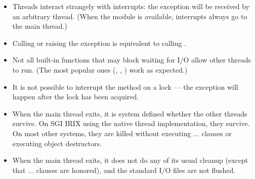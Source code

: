 
\begin{itemize}
\item
Threads interact strangely with interrupts: the
 exception will be received by an
arbitrary thread.  (When the 
module is available, interrupts always go to the main thread.)

\item
Calling  or raising the 
exception is equivalent to calling .

\item
Not all built-in functions that may block waiting for I/O allow other
threads to run.  (The most popular ones (,
, ) work as
expected.)

\item
It is not possible to interrupt the  method on a lock
--- the  exception will happen after the
lock has been acquired.

\item
When the main thread exits, it is system defined whether the other
threads survive.  On SGI IRIX using the native thread implementation,
they survive.  On most other systems, they are killed without
executing  ...  clauses or executing
object destructors.

\item
When the main thread exits, it does not do any of its usual cleanup
(except that  ...  clauses are honored),
and the standard I/O files are not flushed.

\end{itemize}
